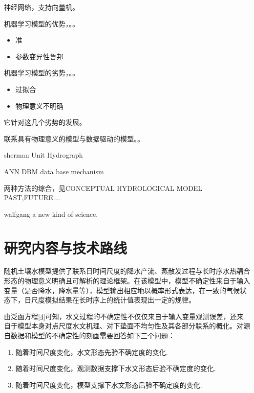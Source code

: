 神经网络，支持向量机。

机器学习模型的优势，。。
\begin{itemize}
\item 准
\item 参数变异性鲁邦
\end{itemize}

机器学习模型的劣势，。。
\begin{itemize}
\item 过拟合
\item 物理意义不明确
\end{itemize}

它针对这几个劣势的发展。

联系具有物理意义的模型与数据驱动的模型。。

sherman Unit Hydrograph

ANN
DBM data base mechanism

两种方法的综合，见CONCEPTUAL HYDROLOGICAL MODEL PAST,FUTURE....

walfgang  a new kind of science.
\fi
\section{研究内容与技术路线}
随机土壤水模型提供了联系日时间尺度的降水产流、蒸散发过程与长时序水热耦合形态的物理意义明确且可解析的理论框架。在该模型中，模型不确定性来自于输入变量（是否降水，降水量等），模型输出相应地以概率形式表达，在一致的气候状态下，日尺度模拟结果在长时序上的统计值表现出一定的规律。

由泛函方程\ref{4}可知，水文过程的不确定性不仅仅来自于输入变量观测误差，还来自于模型本身对点尺度水文机理、对下垫面不均匀性及其各部分联系的概化。对源自数据和模型的不确定性的刻画需要回答如下三个问题： 

\begin{enumerate}
\item 随着时间尺度变化，水文形态先验不确定度的变化.
\item 随着时间尺度变化，观测数据支撑下水文形态后验不确定度的变化.
\item 随着时间尺度变化，模型支撑下水文形态后验不确定度的变化.
\end{enumerate}

